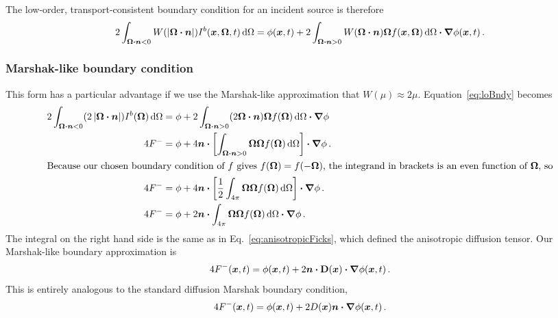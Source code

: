 The low-order, transport-consistent boundary condition for an incident source
is therefore
\begin{equation}\label{eq:loBndy}
  2\int_{\bm{\Omega}\bm{\cdot} \bm{n} < 0}
  W(\left| \bm{\Omega} \bm{\cdot} \bm{n} \right|) I^b(\bm{x}, \bm{\Omega}, t) \mathop{}\!\mathrm{d}\Omega
  = \phi(\bm{x}, t)
  + 2\int_{\bm{\Omega}\bm{\cdot} \bm{n} > 0} W(\bm{\Omega} \bm{\cdot} \bm{n})
  \bm{\Omega} f(\bm{x}, \bm{\Omega}) \mathop{}\!\mathrm{d}\Omega
  \bm{\cdot} \bm{\nabla} \phi(\bm{x}, t) \,.
\end{equation}

\subsubsection{Marshak-like boundary condition}
This form has a particular advantage if we use the Marshak-like approximation
that $W(\mu)\approx 2\mu$. Equation~\eqref{eq:loBndy} becomes
\begin{align*}
  2\int_{\bm{\Omega}\bm{\cdot} \bm{n} < 0}
  ( 2\left| \bm{\Omega} \bm{\cdot} \bm{n} \right| ) I^b(\bm{\Omega}) \mathop{}\!\mathrm{d}\Omega
  &= \phi
  + 2\int_{\bm{\Omega}\bm{\cdot} \bm{n} > 0} ( 2\bm{\Omega} \bm{\cdot} \bm{n} )
  \bm{\Omega} f(\bm{\Omega}) \mathop{}\!\mathrm{d}\Omega \bm{\cdot} \bm{\nabla} \phi
  \\
  4 F^-
  &= \phi
  + 4 \bm{n} \bm{\cdot} \left[ \int_{\bm{\Omega}\bm{\cdot} \bm{n} > 0} \bm{\Omega}
  \bm{\Omega} f(\bm{\Omega}) \mathop{}\!\mathrm{d}\Omega \right] \bm{\cdot} \bm{\nabla} \phi \,.
  \\ 
  \intertext{Because our chosen boundary condition of $f$ gives
  $f(\bm{\Omega})=f(-\bm{\Omega})$, the integrand in
  brackets is an even function of $\bm{\Omega}$, so}
  4 F^-
  &= \phi
  + 4 \bm{n} \bm{\cdot}  \left[ \frac{1}{2} \int_{4\pi}
  \bm{\Omega} \bm{\Omega} f(\bm{\Omega}) \mathop{}\!\mathrm{d}\Omega \right] \bm{\cdot} \bm{\nabla} \phi \,.
  \\
  4 F^-
  &= \phi
  + 2 \bm{n} \bm{\cdot} \int_{4\pi}
  \bm{\Omega} \bm{\Omega} f(\bm{\Omega}) \mathop{}\!\mathrm{d}\Omega \bm{\cdot} \bm{\nabla} \phi \,.
\end{align*}
The integral on the right hand side is the same as in
  Eq.~\eqref{eq:anisotropicFicks}, which defined the anisotropic diffusion
  tensor. Our Marshak-like boundary approximation is
\begin{equation}\label{eq:marshakAd}
  4 F^-(\bm{x}, t)
  = \phi(\bm{x}, t)
  + 2 \bm{n} \bm{\cdot} \mathbf{D}(\bm{x}) \bm{\cdot} \bm{\nabla} \phi(\bm{x}, t) \,.
\end{equation}
This is entirely analogous to the standard diffusion Marshak boundary condition,
\begin{equation*}
  4 F^-(\bm{x}, t) = \phi(\bm{x}, t)
  + 2  D(\bm{x}) \bm{n} \bm{\cdot} \bm{\nabla} \phi(\bm{x}, t)\,.
\end{equation*}

